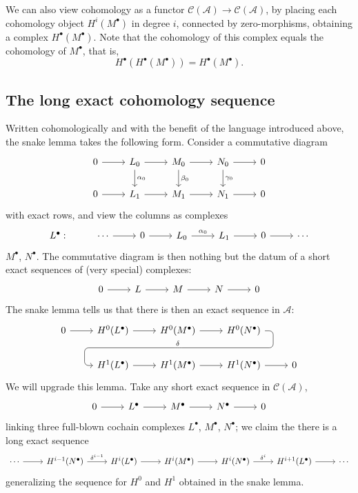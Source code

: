 We can also view cohomology as a functor $\mathcal{C}(\mathcal{A})\to\mathcal{C}(\mathcal{A})$, by placing each
cohomology object $H^i(M^\bullet)$ in degree $i$, connected by zero-morphisms, obtaining a
complex $H^\bullet(M^\bullet)$. Note that the cohomology of this complex equals the cohomology of $M^\bullet$, that is,
\[H^\bullet(H^\bullet(M^\bullet))=H^\bullet(M^\bullet).\]
\subsection{The long exact cohomology sequence}
Written cohomologically and with the benefit of the language introduced above, the snake lemma takes the following form. Consider a commutative diagram
\[\begin{tikzcd}
0\ar[r]&L_0\ar[d,"\alpha_0"]\ar[r]&M_0\ar[d,"\beta_0"]\ar[r]&N_0\ar[d,"\gamma_0"]\ar[r]&0\\
0\ar[r]&L_1\ar[r]&M_1\ar[r]&N_1\ar[r]&0
\end{tikzcd}\]
with exact rows, and view the columns as complexes
\[\begin{tikzcd}
L^\bullet:&\cdots\ar[r]&0\ar[r]&L_0\ar[r,"\alpha_0"]&L_1\ar[r]&0\ar[r]&\cdots
\end{tikzcd}\]
$M^\bullet$, $N^\bullet$. The commutative diagram is then nothing but the datum of a short exact sequences of (very special) complexes:
\[\begin{tikzcd}
0\ar[r]&L\ar[r]&M\ar[r]&N\ar[r]&0
\end{tikzcd}\]
The snake lemma tells us that there is then an exact sequence in $\mathcal{A}$:
\[\begin{tikzcd}
0\ar[r]&H^0(L^\bullet)\ar[r] &H^0(M^\bullet)\ar[r]
\ar[draw=none]{d}[name=X, anchor=center]{}&H^0(N^\bullet)\ar[rounded corners,swap,
to path={
    --([xshift=2ex]\tikztostart.east)
	|- (X.center) \tikztonodes
	-| ([xshift=-2ex]\tikztotarget.west)
	-- (\tikztotarget)}]{dll}[at end]{\delta}&\\
&H^1(L^\bullet)\ar[r] &H^1(M^\bullet)\ar[r]&H^1(N^\bullet)\ar[r]&0
\end{tikzcd}\]
We will upgrade this lemma. Take any short exact sequence in $\mathcal{C}(\mathcal{A})$,
\[\begin{tikzcd}
0\ar[r]&L^\bullet\ar[r]&M^\bullet\ar[r]&N^\bullet\ar[r]&0
\end{tikzcd}\]
linking three full-blown cochain complexes $L^\bullet$, $M^\bullet$, $N^\bullet$; we claim the there is a long exact sequence
\[\begin{tikzcd}[scale=0.9]
\cdots\ar[r]&H^{i-1}(N^\bullet)\ar[r,"\delta^{i-1}"]&H^i(L^\bullet)\ar[r]&H^i(M^\bullet)\ar[r]&H^i(N^\bullet)\ar[r,"\delta^i"]&H^{i+1}(L^\bullet)\ar[r]&\cdots
\end{tikzcd}\]
generalizing the sequence for $H^0$ and $H^1$ obtained in the snake lemma.
